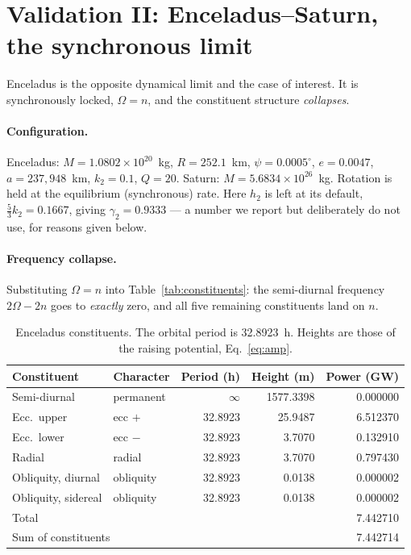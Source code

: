 \documentclass[11pt]{article}
\newcommand{\Om}{\Omega}
\begin{document}
\section{Validation II: Enceladus--Saturn, the synchronous limit}
\label{sec:enceladus}

Enceladus is the opposite dynamical limit and the case of interest. It is
synchronously locked, $\Om = n$, and the constituent structure
\emph{collapses}.

\paragraph{Configuration.} Enceladus: $M=1.0802\times10^{20}$~kg,
$R=252.1$~km, $\psi=0.0005^\circ$, $e=0.0047$, $a=237{,}948$~km, $k_2=0.1$,
$Q=20$. Saturn: $M=5.6834\times10^{26}$~kg. Rotation is held at the
equilibrium (synchronous) rate. Here $h_2$ is left at its default,
$\tfrac53 k_2 = 0.1667$, giving $\gamma_2 = 0.9333$ --- a number we report but
deliberately do not use, for reasons given below.

\paragraph{Frequency collapse.} Substituting $\Om=n$ into
Table~\ref{tab:constituents}: the semi-diurnal frequency $2\Om-2n$ goes to
\emph{exactly} zero, and all five remaining constituents land on $n$.

\begin{table}[h]
\centering
\caption{Enceladus constituents. The orbital period is 32.8923~h. Heights are
those of the raising potential, Eq.~\eqref{eq:amp}.}
\label{tab:enceladus}
\begin{tabular}{llrrr}
\toprule
Constituent & Character & Period (h) & Height (m) & Power (GW) \\
\midrule
Semi-diurnal        & permanent & $\infty$ & 1577.3398 & 0.000000 \\
Ecc.\ upper         & ecc $+$   & 32.8923 & 25.9487 & 6.512370 \\
Ecc.\ lower         & ecc $-$   & 32.8923 & 3.7070  & 0.132910 \\
Radial              & radial    & 32.8923 & 3.7070  & 0.797430 \\
Obliquity, diurnal  & obliquity & 32.8923 & 0.0138  & 0.000002 \\
Obliquity, sidereal & obliquity & 32.8923 & 0.0138  & 0.000002 \\
\midrule
\multicolumn{4}{l}{Total} & 7.442710 \\
\multicolumn{4}{l}{Sum of constituents} & 7.442714 \\
\bottomrule
\end{tabular}
\end{table}
\end{document}
